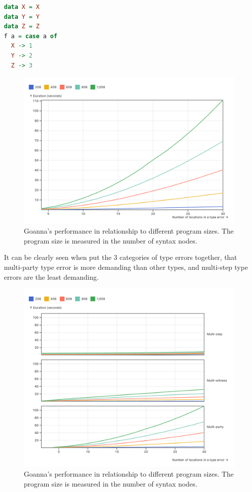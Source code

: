\documentclass[pdflatex,sn-mathphys-num]{sn-jnl}%
\begin{document}
\begin{lstlisting}[language=Haskell, caption=Multi-Party Hakslel Example, label={lst:eval-multi-party}]
data X = X
data Y = Y
data Z = Z
f a = case a of 
  X -> 1
  Y -> 2
  Z -> 3
\end{lstlisting}

 \begin{figure}[ht]
        \centering
        \includegraphics[width=0.8\linewidth]{images/multi-party-time.png}
        \caption{Goanna's performance in relationship to different program sizes. The program size is measured in the number of syntax nodes.}
        \label{fig:multi-party-time}
    \end{figure}

It can be clearly seen when put the 3 categories of type errors together, that multi-party type error is more demanding than other types, and multi-step type errors are the least demanding. 
     \begin{figure}[ht]
        \centering
        \includegraphics[width=\linewidth]{images/compare-time.png}
        \caption{Goanna's performance in relationship to different program sizes. The program size is measured in the number of syntax nodes.}
        \label{fig:compare-time}
    \end{figure}
\end{document}
